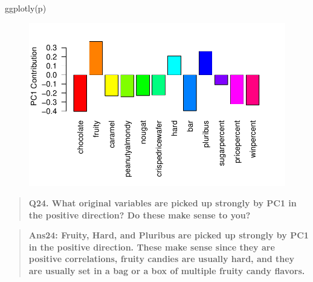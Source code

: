 \documentclass[
  letterpaper,
  DIV=11,
  numbers=noendperiod]{scrartcl}
\newenvironment{Shaded}{\begin{snugshade}}{\end{snugshade}}
\newcommand{\AttributeTok}[1]{\textcolor[rgb]{0.40,0.45,0.13}{#1}}
\newcommand{\DecValTok}[1]{\textcolor[rgb]{0.68,0.00,0.00}{#1}}
\newcommand{\FunctionTok}[1]{\textcolor[rgb]{0.28,0.35,0.67}{#1}}
\newcommand{\NormalTok}[1]{\textcolor[rgb]{0.00,0.23,0.31}{#1}}
\newcommand{\SpecialCharTok}[1]{\textcolor[rgb]{0.37,0.37,0.37}{#1}}
\newcommand{\StringTok}[1]{\textcolor[rgb]{0.13,0.47,0.30}{#1}}
\begin{document}
\begin{Shaded}
\begin{Highlighting}[]
\FunctionTok{ggplotly}\NormalTok{(p)}
\end{Highlighting}
\end{Shaded}

\begin{Shaded}
\end{Shaded}

\begin{figure}[H]

{\centering \includegraphics{class10_files/figure-pdf/unnamed-chunk-36-1.pdf}

}

\end{figure}

\begin{quote}
\textbf{Q24. What original variables are picked up strongly by PC1 in
the positive direction? Do these make sense to you?}
\end{quote}

\begin{quote}
\textbf{Ans24: Fruity, Hard, and Pluribus are picked up strongly by PC1
in the positive direction. These make sense since they are positive
correlations, fruity candies are usually hard, and they are usually set
in a bag or a box of multiple fruity candy flavors.}
\end{quote}
\end{document}
